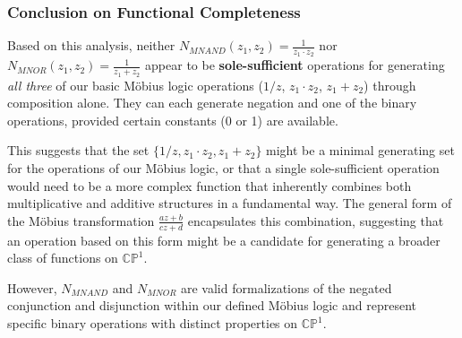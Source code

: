 	\subsubsection{Conclusion on Functional Completeness}

	Based on this analysis, neither $N_{MNAND}(z_1, z_2) = \frac{1}{z_1 \cdot z_2}$ nor $N_{MNOR}(z_1, z_2) = \frac{1}{z_1 + z_2}$ appear to be \textbf{sole-sufficient} operations for generating \textit{all three} of our basic M\"{o}bius logic operations ($1/z$, $z_1 \cdot z_2$, $z_1 + z_2$) through composition alone. They can each generate negation and one of the binary operations, provided certain constants (0 or 1) are available.

	This suggests that the set $\{1/z, z_1 \cdot z_2, z_1 + z_2\}$ might be a minimal generating set for the operations of our M\"{o}bius logic, or that a single sole-sufficient operation would need to be a more complex function that inherently combines both multiplicative and additive structures in a fundamental way. The general form of the M\"{o}bius transformation $\frac{az+b}{cz+d}$ encapsulates this combination, suggesting that an operation based on this form might be a candidate for generating a broader class of functions on $\mathbb{CP}^1$.

	However, $N_{MNAND}$ and $N_{MNOR}$ are valid formalizations of the negated conjunction and disjunction within our defined M\"{o}bius logic and represent specific binary operations with distinct properties on $\mathbb{CP}^1$.

